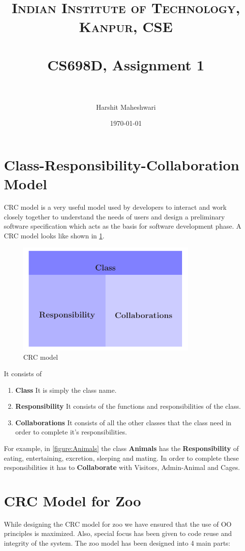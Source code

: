 \documentclass[paper=a4, fontsize=11pt]{scrartcl} %
\title{	
\normalfont \normalsize 
\textsc{Indian Institute of Technology, Kanpur, CSE} \\ [25pt] %
\horrule{0.5pt} \\[0.4cm] %
\huge CS698D, Assignment 1  \\ %
\horrule{2pt} \\[0.5cm] %
}
\author{Harshit Maheshwari} %
\date{\normalsize\today} %
\numberwithin{equation}{section} %
\numberwithin{figure}{section} %
\numberwithin{table}{section} %
\begin{document}


\section{Class-Responsibility-Collaboration Model\label{CRCModel}}
CRC model is a very useful model used by developers to interact and work closely together to understand the needs of users and design a preliminary software specification which acts as the basis for software development phase. A CRC model looks like shown in \ref{figure:CRCModel}.
\begin{figure}
\centering
\includegraphics[width = 9cm]{crc.pdf}
\caption{CRC model\label{figure:CRCModel}}
\end{figure}
It consists of
\begin{enumerate}
	\item \textbf{Class} It is simply the class name.
	\item \textbf{Responsibility} It consists of the functions and responsibilities of the class. 
	\item \textbf{Collaborations} It consists of all the other classes that the class need in order to complete it's responsibilities. 
\end{enumerate}
For example, in \ref{figure:Animals} the class \textbf{Animals} has the \textbf{Responsibility} of eating, entertaining, excretion, sleeping and mating. In order to complete these responsibilities it has to \textbf{Collaborate} with Visitors, Admin-Animal and Cages.

\section{CRC Model for Zoo\label{ZooModel}}
While designing the CRC model for zoo we have ensured that the use of OO principles is maximized. Also, special focus has been given to code reuse and integrity of the system.
The zoo model has been designed into 4 main parts: 
\end{document}
